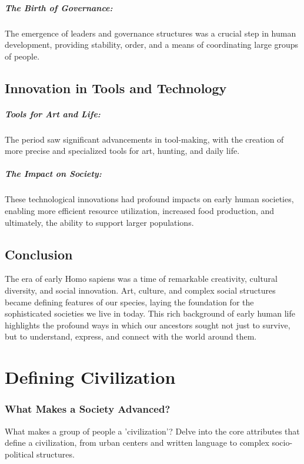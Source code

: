 \documentclass[a4paper,12pt]{book}
\begin{document}
\paragraph{The Birth of Governance:}
The emergence of leaders and governance structures was a crucial step in human development, providing stability, order, and a means of coordinating large groups of people.

\section*{Innovation in Tools and Technology}

\paragraph{Tools for Art and Life:}
The period saw significant advancements in tool-making, with the creation of more precise and specialized tools for art, hunting, and daily life.

\paragraph{The Impact on Society:}
These technological innovations had profound impacts on early human societies, enabling more efficient resource utilization, increased food production, and ultimately, the ability to support larger populations.

\section*{Conclusion}

The era of early Homo sapiens was a time of remarkable creativity, cultural diversity, and social innovation. Art, culture, and complex social structures became defining features of our species, laying the foundation for the sophisticated societies we live in today. This rich background of early human life highlights the profound ways in which our ancestors sought not just to survive, but to understand, express, and connect with the world around them.

\chapter{Defining Civilization}
\subsection*{What Makes a Society Advanced?}
What makes a group of people a 'civilization'? Delve into the core attributes that define a civilization, from urban centers and written language to complex socio-political structures.
\end{document}
